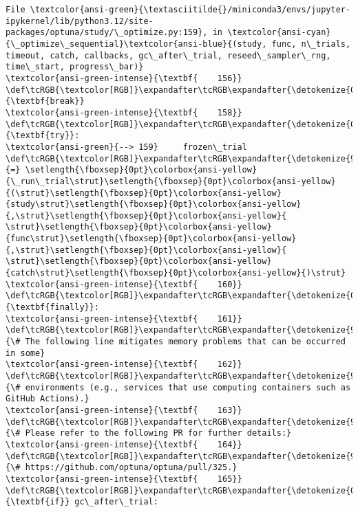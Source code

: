 \documentclass[11pt]{article}
\begin{document}
\begin{Verbatim}[commandchars=\\\{\}, frame=single, framerule=2mm, rulecolor=\color{outerrorbackground}]
File \textcolor{ansi-green}{\textasciitilde{}/miniconda3/envs/jupyter-ipykernel/lib/python3.12/site-packages/optuna/study/\_optimize.py:159}, in \textcolor{ansi-cyan}{\_optimize\_sequential}\textcolor{ansi-blue}{(study, func, n\_trials, timeout, catch, callbacks, gc\_after\_trial, reseed\_sampler\_rng, time\_start, progress\_bar)}
\textcolor{ansi-green-intense}{\textbf{    156}}         \def\tcRGB{\textcolor[RGB]}\expandafter\tcRGB\expandafter{\detokenize{0,135,0}}{\textbf{break}}
\textcolor{ansi-green-intense}{\textbf{    158}} \def\tcRGB{\textcolor[RGB]}\expandafter\tcRGB\expandafter{\detokenize{0,135,0}}{\textbf{try}}:
\textcolor{ansi-green}{--> 159}     frozen\_trial \def\tcRGB{\textcolor[RGB]}\expandafter\tcRGB\expandafter{\detokenize{98,98,98}}{=} \setlength{\fboxsep}{0pt}\colorbox{ansi-yellow}{\_run\_trial\strut}\setlength{\fboxsep}{0pt}\colorbox{ansi-yellow}{(\strut}\setlength{\fboxsep}{0pt}\colorbox{ansi-yellow}{study\strut}\setlength{\fboxsep}{0pt}\colorbox{ansi-yellow}{,\strut}\setlength{\fboxsep}{0pt}\colorbox{ansi-yellow}{ \strut}\setlength{\fboxsep}{0pt}\colorbox{ansi-yellow}{func\strut}\setlength{\fboxsep}{0pt}\colorbox{ansi-yellow}{,\strut}\setlength{\fboxsep}{0pt}\colorbox{ansi-yellow}{ \strut}\setlength{\fboxsep}{0pt}\colorbox{ansi-yellow}{catch\strut}\setlength{\fboxsep}{0pt}\colorbox{ansi-yellow}{)\strut}
\textcolor{ansi-green-intense}{\textbf{    160}} \def\tcRGB{\textcolor[RGB]}\expandafter\tcRGB\expandafter{\detokenize{0,135,0}}{\textbf{finally}}:
\textcolor{ansi-green-intense}{\textbf{    161}}     \def\tcRGB{\textcolor[RGB]}\expandafter\tcRGB\expandafter{\detokenize{95,135,135}}{\# The following line mitigates memory problems that can be occurred in some}
\textcolor{ansi-green-intense}{\textbf{    162}}     \def\tcRGB{\textcolor[RGB]}\expandafter\tcRGB\expandafter{\detokenize{95,135,135}}{\# environments (e.g., services that use computing containers such as GitHub Actions).}
\textcolor{ansi-green-intense}{\textbf{    163}}     \def\tcRGB{\textcolor[RGB]}\expandafter\tcRGB\expandafter{\detokenize{95,135,135}}{\# Please refer to the following PR for further details:}
\textcolor{ansi-green-intense}{\textbf{    164}}     \def\tcRGB{\textcolor[RGB]}\expandafter\tcRGB\expandafter{\detokenize{95,135,135}}{\# https://github.com/optuna/optuna/pull/325.}
\textcolor{ansi-green-intense}{\textbf{    165}}     \def\tcRGB{\textcolor[RGB]}\expandafter\tcRGB\expandafter{\detokenize{0,135,0}}{\textbf{if}} gc\_after\_trial:


\end{Verbatim}
\end{document}
